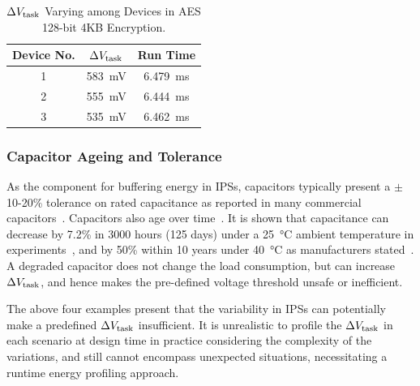 \begin{table}
    \renewcommand{\arraystretch}{1.2}
    \centering
    \begin{tabular}{|c|c|c|}
    \hline
    \textbf{Device No.} & \textbf{$\Delta V_{\text{task}}$} & \textbf{Run Time} \\
    \hline
    1 & \SI{583}{\milli\volt} & \SI{6.479}{\milli\second} \\
    2 & \SI{555}{\milli\volt} & \SI{6.444}{\milli\second} \\
    3 & \SI{535}{\milli\volt} & \SI{6.462}{\milli\second} \\
    \hline
    \end{tabular}
    \caption{$\Delta V_{\text{task}}$ Varying among Devices in AES 128-bit 4KB Encryption.}
    \label{tab:device}
\end{table}

\subsubsection{Capacitor Ageing and Tolerance}
\label{subsubsec:capacitance_variability}

As the component for buffering energy in IPSs, capacitors typically present a $\pm$10-20\% tolerance on rated capacitance as reported in many commercial capacitors~\cite{tancap1, tancap2, tancap3, alcapacitor}. 
Capacitors also age over time~\cite{teverovsky2014insulation}. 
It is shown that capacitance can decrease by 7.2\% in 3000 hours (125 days) under a \SI{25}{\celsius} ambient temperature in experiments~\cite{kulkarni2010experimental}, and by 50\% within 10 years under \SI{40}{\celsius} as manufacturers stated~\cite{vishaycapacitor}.
A degraded capacitor does not change the load consumption, but can increase $\Delta V_{\text{task}}$, and hence makes the pre-defined voltage threshold unsafe or inefficient. 


The above four examples present that the variability in IPSs can potentially make a predefined $\Delta V_{\text{task}}$ insufficient. 
It is unrealistic to profile the $\Delta V_{\text{task}}$ in each scenario at design time in practice considering the complexity of the variations, and still cannot encompass unexpected situations, necessitating a runtime energy profiling approach. 


